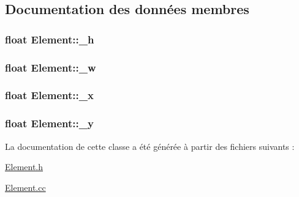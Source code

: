 \subsection{Documentation des données membres}
\hypertarget{classElement_ad85a5542632bf3743732e850cace440a}{
\subsubsection[{\_\-h}]{\setlength{\rightskip}{0pt plus 5cm}float {\bf Element::\_\-h}}}
\label{classElement_ad85a5542632bf3743732e850cace440a}
\hypertarget{classElement_afb51ae7098030ef7728599020b530353}{
\subsubsection[{\_\-w}]{\setlength{\rightskip}{0pt plus 5cm}float {\bf Element::\_\-w}}}
\label{classElement_afb51ae7098030ef7728599020b530353}
\hypertarget{classElement_a9b05f301c158132593eb48241a839fe2}{
\subsubsection[{\_\-x}]{\setlength{\rightskip}{0pt plus 5cm}float {\bf Element::\_\-x}}}
\label{classElement_a9b05f301c158132593eb48241a839fe2}
\hypertarget{classElement_afb65917274d01d02623c99994e22450d}{
\subsubsection[{\_\-y}]{\setlength{\rightskip}{0pt plus 5cm}float {\bf Element::\_\-y}}}
\label{classElement_afb65917274d01d02623c99994e22450d}


La documentation de cette classe a été générée à partir des fichiers suivants :\begin{DoxyCompactItemize}
\item 
\hyperlink{Element_8h}{Element.h}\item 
\hyperlink{Element_8cc}{Element.cc}\end{DoxyCompactItemize}
